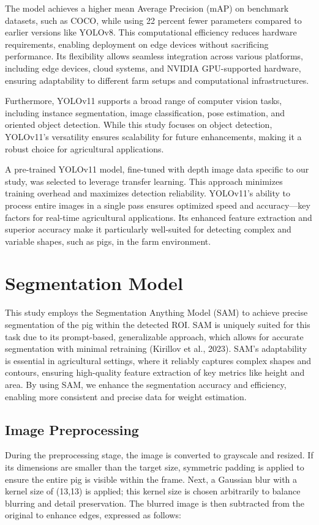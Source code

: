 {The model achieves a higher mean Average Precision (mAP) on benchmark datasets, such as COCO, while using 22 percent fewer parameters compared to earlier versions like YOLOv8. This computational efficiency reduces hardware requirements, enabling deployment on edge devices without sacrificing performance. Its flexibility allows seamless integration across various platforms, including edge devices, cloud systems, and NVIDIA GPU-supported hardware, ensuring adaptability to different farm setups and computational infrastructures.

Furthermore, YOLOv11 supports a broad range of computer vision tasks, including instance segmentation, image classification, pose estimation, and oriented object detection. While this study focuses on object detection, YOLOv11’s versatility ensures scalability for future enhancements, making it a robust choice for agricultural applications.

A pre-trained YOLOv11 model, fine-tuned with depth image data specific to our study, was selected to leverage transfer learning. This approach minimizes training overhead and maximizes detection reliability. YOLOv11’s ability to process entire images in a single pass ensures optimized speed and accuracy—key factors for real-time agricultural applications. Its enhanced feature extraction and superior accuracy make it particularly well-suited for detecting complex and variable shapes, such as pigs, in the farm environment.


\section{Segmentation Model}
This study employs the Segmentation Anything Model (SAM) to achieve precise segmentation of the pig within the detected ROI. SAM is uniquely suited for this task due to its prompt-based, generalizable approach, which allows for accurate segmentation with minimal retraining (Kirillov et al., 2023). SAM’s adaptability is essential in agricultural settings, where it reliably captures complex shapes and contours, ensuring high-quality feature extraction of key metrics like height and area. By using SAM, we enhance the segmentation accuracy and efficiency, enabling more consistent and precise data for weight estimation.
\subsection{Image Preprocessing}
During the preprocessing stage, the image is converted to grayscale and resized. If its dimensions are smaller than the target size, symmetric padding is applied to ensure the entire pig is visible within the frame. Next, a Gaussian blur with a kernel size of (13,13) is applied; this kernel size is chosen arbitrarily to balance blurring and detail preservation. The blurred image is then subtracted from the original to enhance edges, expressed as follows:


}

